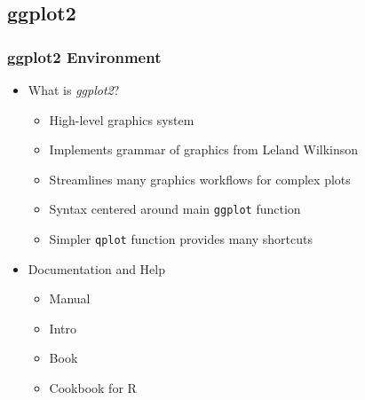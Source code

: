 \documentclass{beamer}
\newcommand{\Rfunction}[1]{{\texttt{#1}}}
\newcommand{\Rpackage}[1]{{\textit{#1}}}
\begin{document}
\subsection{ggplot2}
\begin{frame}[containsverbatim]  
	\frametitle{ggplot2 Environment}
\begin{itemize}
	\item What is \Rpackage{ggplot2}?
        \begin{itemize}
		\item High-level graphics system
		\item Implements grammar of graphics from Leland Wilkinson \href{http://www.amazon.com/Grammar-Graphics-Leland-Wilkinson/dp/0387987746}{{}} 
		\item Streamlines many graphics workflows for complex plots
		\item Syntax centered around main \Rfunction{ggplot} function 
		\item Simpler \Rfunction{qplot} function provides many shortcuts
        \end{itemize}
        \item Documentation and Help
        \begin{itemize}
                \item Manual \href{http://had.co.nz/ggplot2/}{{}}
                \item Intro \href{http://www.ling.upenn.edu/~joseff/rstudy/summer2010_ggplot2_intro.html}{{}}
                \item Book \href{http://had.co.nz/ggplot2/book/}{{}} 
                \item Cookbook for R \href{http://www.cookbook-r.com/Graphs/}{{}} 
        \end{itemize}
\end{itemize}
\end{frame}
\end{document}
